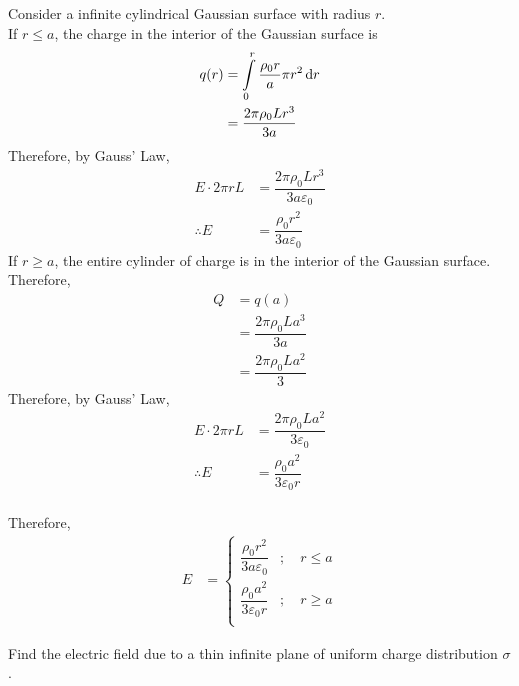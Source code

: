 \documentclass[fleqn, a4paper, 12pt, twoside]{article}
\theoremstyle{definition}
\theoremstyle{theorem}
\begin{document}
\begin{solution}
	Consider a infinite cylindrical Gaussian surface with radius $r$.\\
	If $r \leq a$, the charge in the interior of the Gaussian surface is
	\begin{align*}
		q(r) &= \int\limits_{0}^{r} \dfrac{\rho_0 r}{a} \pi r^2 \dif r\\
		&= \dfrac{2 \pi \rho_0 L r^3}{3 a}
	\end{align*}
	Therefore, by Gauss' Law,
	\begin{align*}
		E \cdot 2 \pi r L &= \dfrac{2 \pi \rho_0 L r^3}{3 a \varepsilon_0}\\
		\therefore E &= \dfrac{\rho_0 r^2}{3 a \varepsilon_0}
	\end{align*}
	If $r \geq a$, the entire cylinder of charge is in the interior of the Gaussian surface.\\
	Therefore,
	\begin{align*}
		Q &= q(a)\\
		&= \dfrac{2 \pi \rho_0 L a^3}{3 a}\\
		&= \dfrac{2 \pi \rho_0 L a^2}{3}
	\end{align*}
	Therefore, by Gauss' Law,
	\begin{align*}
		E \cdot 2 \pi r L &= \dfrac{2 \pi \rho_0 L a^2}{3 \varepsilon_0}\\
		\therefore E &= \dfrac{\rho_0 a^2}{3 \varepsilon_0 r}
	\end{align*}
	~\\
	Therefore,
	\begin{align*}
		E &= 
			\begin{cases}
				\dfrac{\rho_0 r^2}{3 a \varepsilon_0} &;\quad r \leq a\\
				\dfrac{\rho_0 a^2}{3 \varepsilon_0 r} &; \quad r \geq a\\
			\end{cases}
	\end{align*}
\end{solution}

\begin{question}
	Find the electric field due to a thin infinite plane of uniform charge distribution $\sigma$.
\end{question}
\end{document}
